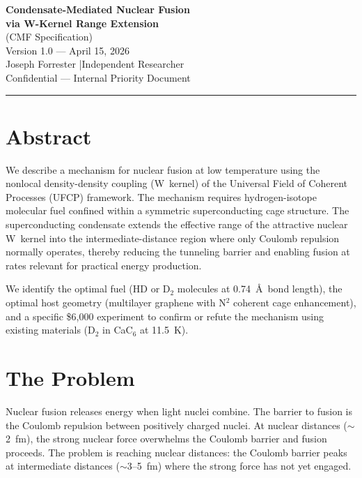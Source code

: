 \documentclass[11pt, a4paper]{article}
\begin{document}
\begin{center}
  {\LARGE \textbf{Condensate-Mediated Nuclear Fusion}}\\[4pt]
  {\LARGE \textbf{via W-Kernel Range Extension}}\\[6pt]
  {\large (CMF Specification)}\\[8pt]
  {\color{nm-gray}\small Version 1.0 --- April 15, 2026}\\[4pt]
  {\color{nm-gray}\small Joseph Forrester \quad|\quad Independent Researcher}\\[4pt]
  {\color{nm-gray}\small Confidential --- Internal Priority Document}
\end{center}

\vspace{1em}
\hrule
\vspace{1em}

\section*{Abstract}

We describe a mechanism for nuclear fusion at low temperature
using the nonlocal density-density coupling (W~kernel) of the
Universal Field of Coherent Processes (UFCP) framework. The
mechanism requires hydrogen-isotope molecular fuel confined
within a symmetric superconducting cage structure. The
superconducting condensate extends the effective range of the
attractive nuclear W~kernel into the intermediate-distance
region where only Coulomb repulsion normally operates, thereby
reducing the tunneling barrier and enabling fusion at rates
relevant for practical energy production.

We identify the optimal fuel (HD or D$_2$ molecules at
0.74~\AA\ bond length), the optimal host geometry (multilayer
graphene with N$^2$ coherent cage enhancement), and a specific
\$6{,}000 experiment to confirm or refute the mechanism using
existing materials (D$_2$ in CaC$_6$ at 11.5~K).

\tableofcontents

\section{The Problem}

Nuclear fusion releases energy when light nuclei combine. The
barrier to fusion is the Coulomb repulsion between positively
charged nuclei. At nuclear distances ($\sim$2~fm), the strong
nuclear force overwhelms the Coulomb barrier and fusion proceeds.
The problem is reaching nuclear distances: the Coulomb barrier
peaks at intermediate distances ($\sim$3--5~fm) where the strong
force has not yet engaged.
\end{document}

